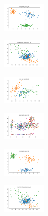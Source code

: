 \begin{figure}[H]
\begin{subfigure}
        \centering
        \includegraphics[width=0.234\textwidth]{img/hs-ls-v2/rand_set_const_20_277451237_clust.png}
    \end{subfigure}
    \hfill
    \begin{subfigure}
        \centering
        \includegraphics[width=0.234\textwidth]{img/hs-ls-v2/newthyroid_set_const_20_277451237_clust.png}
    \end{subfigure}
    \hfill
    \begin{subfigure}
        \centering
        \includegraphics[width=0.234\textwidth]{img/hs-ls-v2/iris_set_const_20_49258669_clust.png}
    \end{subfigure}
    \hfill
    \begin{subfigure}
        \centering
        \includegraphics[width=0.234\textwidth]{img/hs-ls-v2/ecoli_set_const_20_49258669_clust.png}
    \end{subfigure}
    \hfill
    \begin{subfigure}
        \centering
        \includegraphics[width=0.234\textwidth]{img/hs-ls-v2/rand_set_const_20_49258669_clust.png}
    \end{subfigure}
    \hfill
    \begin{subfigure}
        \centering
        \includegraphics[width=0.234\textwidth]{img/hs-ls-v2/newthyroid_set_const_20_49258669_clust.png}

\end{subfigure}
\end{figure}
